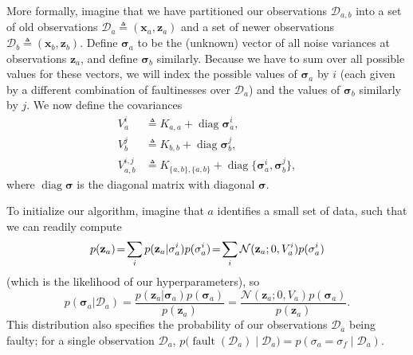 \documentclass{article}
\newcommand{\deq}{\ensuremath{\triangleq}}
\newcommand{\given}{\ensuremath{\mid}}
\newcommand{\cm}[1]{\ensuremath{\mathcal{#1}}}
\newcommand{\bm}[1]{\ensuremath{\mathbf{#1}}}
\newcommand{\data}{\ensuremath{\cm{D}}}
\newcommand{\vect}[1]{\bm{#1}}
\newcommand{\vz}{\vect{z}}
\newcommand{\vx}{\vect{x}}
\newcommand{\vs}{\vect{\sigma}}
\newcommand{\fPr}{p}
\newcommand{\Prob}[2]{\fPr(#1 \given #2 )}
\newcommand{\ps}[2]{p(#1\vert#2)}
\newcommand{\N}[3]{\cm{N}( #1;#2,#3 )}
\newcommand{\defequal}{\triangleq}
\DeclareMathOperator{\fault}{fault}
\DeclareMathOperator{\diag}{diag}
\begin{document}
More formally, imagine that we have partitioned our observations
$\data_{a,b}$ into a set of old observations
$\data_a\deq(\vx_a,\vz_a)$ and a set of newer observations $\data_b
\deq (\vx_b,\vz_b)$. Define $\vs_{a}$ to be the (unknown) vector of
all noise variances at observations $\vz_{a}$, and define $\vs_{b}$
similarly. Because we have to sum over all possible values for these
vectors, we will index the possible values of
$\vs_{a}$ by $i$ (each given by a different combination of
faultinesses over $\data_a$) and the values of $\vs_{b}$ similarly by
$j$. We now define the covariances
\begin{align*}
 V_a^i & \defequal K_{a,a} + \diag \vs_{a}^i,\\
 V_b^j & \defequal K_{b,b} + \diag \vs_{b}^j, \\
 V_{a,b}^{i,j} & \defequal K_{\{a,b\},\{a,b\}} + \diag \{\vs_{a}^i,\vs_{b}^j\},
\end{align*}
where $\diag \vs$ is the diagonal matrix with diagonal $\vs$. 

To initialize our algorithm, imagine that $a$ identifies a small set
of data, such that we can readily compute
\begin{equation}
 \hspace{-0.0cm}p(\vz_a)\!=\!\sum_i  \ps{\vz_a}{\vs^i_a}\fPr(\vs^i_a)
\!=\! \sum_i \N{\vz_a}{0}{V_a^i}\fPr(\vs_a^i) \label{eq:likelihood_a}
\end{equation}
(which is the likelihood of our hyperparameters), so
\begin{equation*}
\ps{\vs_a}{\data_{a}} 
= \frac{\ps{\vz_a}{\vs_a}\fPr(\vs_a)}{p(\vz_a)} 
= \frac{\N{\vz_a}{0}{V_a} \fPr(\vs_a)}{p(\vz_a)}\label{eq:psa}.
\end{equation*}
This distribution also specifies the probability of our observations
$\data_a$ being faulty; for a single observation $\data_a$,
$
p\bigl(\fault(\data_a) \given \data_{a}\bigr) = \Prob{\sigma_a = \sigma_f}{\data_{a}}
$.
\end{document}
